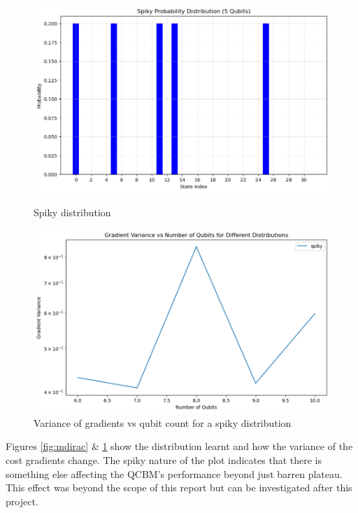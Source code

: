 \documentclass[12pt]{article}
\numberwithin{equation}{section}
\begin{document}
\begin{figure}[h!]
    \centering
    \begin{minipage}{0.48\textwidth}
        \centering
        \includegraphics[width=\linewidth]{mdiracgraph.png}
        \caption{Spiky distribution}
        \label{fig:mdirac}
    \end{minipage}
    \hfill
    \begin{minipage}{0.48\textwidth}
        \centering
        \includegraphics[width=\linewidth]{mdiracbp.png}
        \caption{Variance of gradients vs qubit count for a spiky distribution}
        \label{fig:bpdirac}
    \end{minipage}
\end{figure}
Figures \ref{fig:mdirac} \& \ref{fig:bpdirac} show the distribution learnt and 
how the variance of the cost gradients change. The spiky nature of the plot 
indicates that there is something else affecting the QCBM's performance beyond 
just barren plateau. This effect was beyond the scope of this report but can be 
investigated after this project. 
\end{document}
